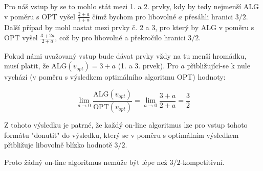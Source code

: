 \documentclass[a4paper, 12pt]{article}
\begin{document}
  Pro náš vstup by se to mohlo stát mezi 1. a 2. prvky, kdy by tedy nejmenší ALG v poměru s OPT vyšel $\frac{2+a}{1+a}$ čímž bychom pro libovolné $a$ přesáhli hranici $3/2$. Další případ by mohl nastat mezi prvky č. 2 a 3, pro který by ALG v poměru s OPT vyšel $\frac{3+2a}{2+a}$, což by pro libovolné a překročilo hranici $3/2$.

  Pokud námi uvažovaný vstup bude dávat prvky vždy na tu menší hromádku, musí platit, že ALG$(v_{opt})=3+a$ (1. a 3. prvek). Pro $a$ přibližující-se k nule vychází (v poměru s výsledkem optimálního algoritmu OPT) hodnoty:

  $$\lim_{a\to0} \frac{\text{ALG}(v_{opt})}{\text{OPT}(v_{opt})}
  =\lim_{a\to0} \frac{3+a}{2+a}
  =\frac{3}{2}$$

  Z tohoto výsledku je patrné, že každý on-line algoritmus lze pro vstup tohoto formátu "donutit" do výsledku, který se v poměru s optimálním výsledkem přibližuje libovolně blízko hodnotě $3/2$.

  Proto žádný on-line algoritmus nemůže být lépe než $3/2$-kompetitivní.
\end{document}
